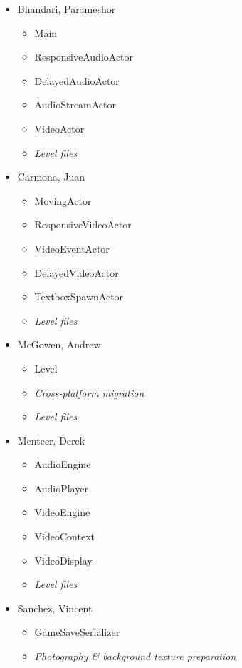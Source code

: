 \documentclass{article}
\begin{document}
      \begin{multicols}{2}
      \begin{itemize}
        \item Bhandari, Parameshor
        	\begin{itemize}
				\item Main
				\item ResponsiveAudioActor
				\item DelayedAudioActor
				\item AudioStreamActor
				\item VideoActor
				\item \emph{Level files}
			\end{itemize}
        \item Carmona, Juan 
        	\begin{itemize}
				\item MovingActor
				\item ResponsiveVideoActor
				\item VideoEventActor
				\item DelayedVideoActor 
				\item TextboxSpawnActor 
				\item \emph{Level files}
			\end{itemize}
        \item McGowen, Andrew 
        	\begin{itemize}
				\item Level 
				\item \emph{Cross-platform migration} 
				\item \emph{Level files}
			\end{itemize}
        \item Menteer, Derek 
        	\begin{itemize}
				\item AudioEngine
				\item AudioPlayer
				\item VideoEngine
				\item VideoContext 
				\item VideoDisplay
				\item \emph{Level files}
			\end{itemize}
        \item Sanchez, Vincent 
        	\begin{itemize}
				\item GameSaveSerializer 
				\item \emph{Photography \& background texture preparation} 

\end{itemize}
\end{itemize}
\end{multicols}
\end{document}
